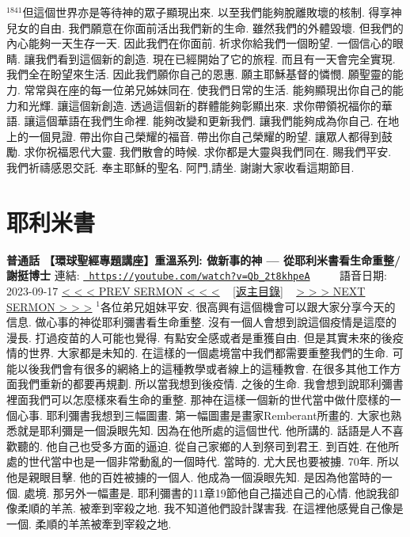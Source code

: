 \documentclass{book}
\begin{document}
$^{1841}$但這個世界亦是等待神的眾子顯現出來.
以至我們能夠脫離敗壞的核制.
得享神兒女的自由.
我們願意在你面前活出我們新的生命.
雖然我們的外體毀壞.
但我們的內心能夠一天生存一天.
因此我們在你面前.
祈求你給我們一個盼望.
一個信心的眼睛.
讓我們看到這個新的創造.
現在已經開始了它的旅程.
而且有一天會完全實現.
我們全在盼望來生活.
因此我們願你自己的恩惠.
願主耶穌基督的憐憫.
願聖靈的能力.
常常與在座的每一位弟兄姊妹同在.
使我們日常的生活.
能夠顯現出你自己的能力和光輝.
讓這個新創造.
透過這個新的群體能夠彰顯出來.
求你帶領祝福你的華語.
讓這個華語在我們生命裡.
能夠改變和更新我們.
讓我們能夠成為你自己.
在地上的一個見證.
帶出你自己榮耀的福音.
帶出你自己榮耀的盼望.
讓眾人都得到鼓勵.
求你祝福恩代大靈.
我們散會的時候.
求你都是大靈與我們同在.
賜我們平安.
我們祈禱感恩交託.
奉主耶穌的聖名.
阿門,請坐.
謝謝大家收看這期節目.
\newpage



\section{耶利米書}
\label{sec:Qb_2t8khpeA}
\textbf{普通話 【環球聖經專題講座】重溫系列: 做新事的神 — 從耶利米書看生命重整/謝挺博士}
\newline
\newline
連結: \href{https://youtube.com/watch?v=Qb_2t8khpeA}{\texttt{ https://youtube.com/watch?v=Qb\_2t8khpeA}} ~~~~ 語音日期: 2023-09-17 
\newline
\newline
\hyperref[sec:U9kQXTUUjvA]{\small{< < < PREV SERMON < < <}}
~
\hyperref[sec:index]{\small{[返主目錄]}}
~
\hyperref[sec:qyGitWfwbVA]{\small{> > > NEXT SERMON > > >}}
\newline
\newline
$^{1}$各位弟兄姐妹平安.
很高興有這個機會可以跟大家分享今天的信息.
做心事的神從耶利彌書看生命重整.
沒有一個人會想到說這個疫情是這麼的漫長.
打過疫苗的人可能也覺得.
有點安全感或者是重獲自由.
但是其實未來的後疫情的世界.
大家都是未知的.
在這樣的一個處境當中我們都需要重整我們的生命.
可能以後我們會有很多的網絡上的這種教學或者線上的這種教會.
在很多其他工作方面我們重新的都要再規劃.
所以當我想到後疫情.
之後的生命.
我會想到說耶利彌書裡面我們可以怎麼樣來看生命的重整.
那神在這樣一個新的世代當中做什麼樣的一個心事.
耶利彌書我想到三幅圖畫.
第一幅圖畫是畫家Remberant所畫的.
大家也熟悉就是耶利彌是一個淚眼先知.
因為在他所處的這個世代.
他所講的.
話語是人不喜歡聽的.
他自己也受多方面的逼迫.
從自己家鄉的人到祭司到君王.
到百姓.
在他所處的世代當中也是一個非常動亂的一個時代.
當時的.
尤大民也要被擄.
70年.
所以他是親眼目擊.
他的百姓被擄的一個人.
他成為一個淚眼先知.
是因為他當時的一個.
處境.
那另外一幅畫是.
耶利彌書的11章19節他自己描述自己的心情.
他說我卻像柔順的羊羔.
被牽到宰殺之地.
我不知道他們設計謀害我.
在這裡他感覺自己像是一個.
柔順的羊羔被牽到宰殺之地.
\end{document}
